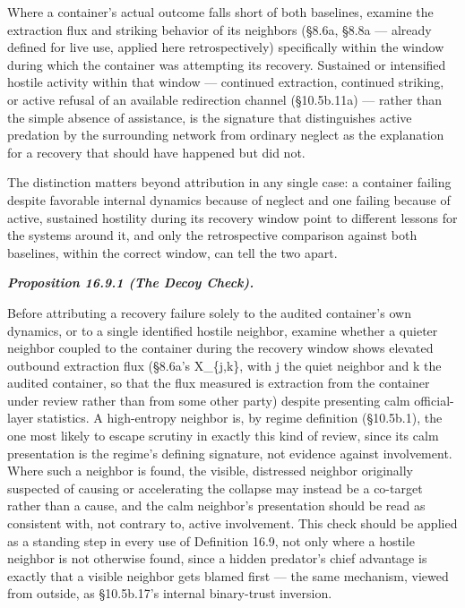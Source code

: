 \documentclass[
]{article}
\begin{document}
Where a container's actual outcome falls short of both baselines,
examine the extraction flux and striking behavior of its neighbors
(§8.6a, §8.8a --- already defined for live use, applied here
retrospectively) specifically within the window during which the
container was attempting its recovery. Sustained or intensified hostile
activity within that window --- continued extraction, continued
striking, or active refusal of an available redirection channel
(§10.5b.11a) --- rather than the simple absence of assistance, is the
signature that distinguishes active predation by the surrounding network
from ordinary neglect as the explanation for a recovery that should have
happened but did not.

The distinction matters beyond attribution in any single case: a
container failing despite favorable internal dynamics because of neglect
and one failing because of active, sustained hostility during its
recovery window point to different lessons for the systems around it,
and only the retrospective comparison against both baselines, within the
correct window, can tell the two apart.

\emph{\textbf{Proposition 16.9.1 (The Decoy Check).}}

Before attributing a recovery failure solely to the audited container's
own dynamics, or to a single identified hostile neighbor, examine
whether a quieter neighbor coupled to the container during the recovery
window shows elevated outbound extraction flux (§8.6a's X\_\{j,k\}, with
j the quiet neighbor and k the audited container, so that the flux
measured is extraction from the container under review rather than from
some other party) despite presenting calm official-layer statistics. A
high-entropy neighbor is, by regime definition (§10.5b.1), the one most
likely to escape scrutiny in exactly this kind of review, since its calm
presentation is the regime's defining signature, not evidence against
involvement. Where such a neighbor is found, the visible, distressed
neighbor originally suspected of causing or accelerating the collapse
may instead be a co-target rather than a cause, and the calm neighbor's
presentation should be read as consistent with, not contrary to, active
involvement. This check should be applied as a standing step in every
use of Definition 16.9, not only where a hostile neighbor is not
otherwise found, since a hidden predator's chief advantage is exactly
that a visible neighbor gets blamed first --- the same mechanism, viewed
from outside, as §10.5b.17's internal binary-trust inversion.
\end{document}

